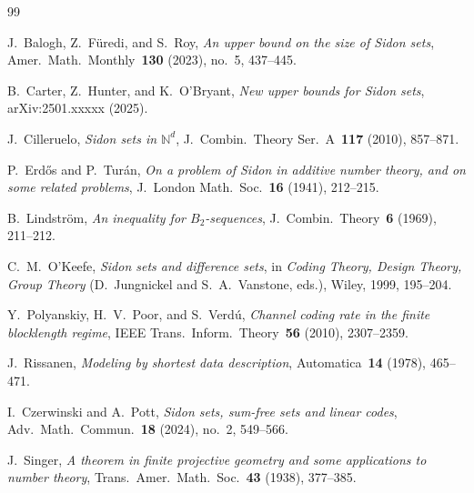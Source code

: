 \documentclass[11pt]{amsart}
\theoremstyle{plain}
\theoremstyle{definition}
\theoremstyle{remark}
\begin{document}
\begin{thebibliography}{99}

J.~Balogh, Z.~F\"uredi, and S.~Roy,
\emph{An upper bound on the size of Sidon sets},
Amer.~Math.~Monthly~\textbf{130} (2023), no.~5, 437--445.

B.~Carter, Z.~Hunter, and K.~O'Bryant,
\emph{New upper bounds for Sidon sets},
arXiv:2501.xxxxx (2025).


J.~Cilleruelo,
\emph{Sidon sets in $\mathbb{N}^d$},
J.~Combin.~Theory Ser.~A~\textbf{117} (2010), 857--871.

P.~Erd\H{o}s and P.~Tur\'an,
\emph{On a problem of Sidon in additive number theory, and on some
  related problems},
J.~London Math.~Soc.~\textbf{16} (1941), 212--215.

B.~Lindstr\"om,
\emph{An inequality for $B_2$-sequences},
J.~Combin.~Theory~\textbf{6} (1969), 211--212.

C.~M.~O'Keefe,
\emph{Sidon sets and difference sets},
in \emph{Coding Theory, Design Theory, Group Theory}
(D.~Jungnickel and S.~A.~Vanstone, eds.), Wiley, 1999, 195--204.

Y.~Polyanskiy, H.~V.~Poor, and S.~Verd\'u,
\emph{Channel coding rate in the finite blocklength regime},
IEEE Trans.~Inform.~Theory~\textbf{56} (2010), 2307--2359.

J.~Rissanen,
\emph{Modeling by shortest data description},
Automatica~\textbf{14} (1978), 465--471.

I.~Czerwinski and A.~Pott,
\emph{Sidon sets, sum-free sets and linear codes},
Adv.~Math.~Commun.~\textbf{18} (2024), no.~2, 549--566.

J.~Singer,
\emph{A theorem in finite projective geometry and some applications
  to number theory},
Trans.~Amer.~Math.~Soc.~\textbf{43} (1938), 377--385.

\end{thebibliography}
\end{document}
